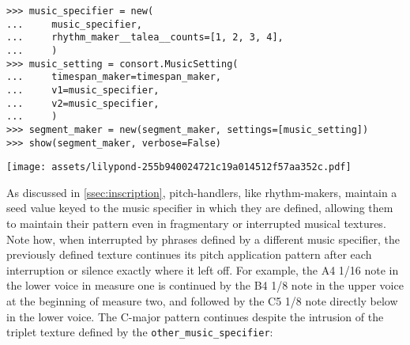 \begin{abjadbookoutput}
\begin{singlespacing}
\vspace{-0.5\baselineskip}
\begin{verbatim}
>>> music_specifier = new(
...     music_specifier,
...     rhythm_maker__talea__counts=[1, 2, 3, 4],
...     )
>>> music_setting = consort.MusicSetting(
...     timespan_maker=timespan_maker,
...     v1=music_specifier,
...     v2=music_specifier,
...     )
>>> segment_maker = new(segment_maker, settings=[music_setting])
>>> show(segment_maker, verbose=False)
\end{verbatim}
\noindent\texttt{[image: assets/lilypond-255b940024721c19a014512f57aa352c.pdf]}
\end{singlespacing}
\end{abjadbookoutput}

\noindent As discussed in \autoref{ssec:inscription}, pitch-handlers, like
rhythm-makers, maintain a seed value keyed to the music specifier in which they
are defined, allowing them to maintain their pattern even in fragmentary or
interrupted musical textures. Note how, when interrupted by phrases defined by
a different music specifier, the previously defined texture continues its pitch
application pattern after each interruption or silence exactly where it left
off. For example, the A4 1/16 note in the lower voice in measure one is
continued by the B4 1/8 note in the upper voice at the beginning of measure
two, and followed by the C5 1/8 note directly below in the lower voice. The
C-major pattern continues despite the intrusion of the triplet texture defined
by the \texttt{other\_music\_specifier}:


\begin{comment}
<abjad>[stylesheet=../consort.ily]
other_music_specifier = consort.MusicSpecifier(
    pitch_handler=consort.AbsolutePitchHandler(pitch_specifier='g fs e f'),
    rhythm_maker=rhythmmakertools.EvenDivisionRhythmMaker(
        denominators=[8],
        extra_counts_per_division=(1,),
        ),
    )
other_music_setting = consort.MusicSetting(
    timespan_maker=consort.TaleaTimespanMaker(
        initial_silence_talea=rhythmmakertools.Talea([1], 2),
        silence_talea=rhythmmakertools.Talea([1], 2),
        ),
    v1=other_music_specifier,
    v2=other_music_specifier,
    )
segment_maker = new(
    segment_maker,
    settings=[music_setting, other_music_setting],
    )
show(segment_maker, verbose=False)
</abjad>
\end{comment}

